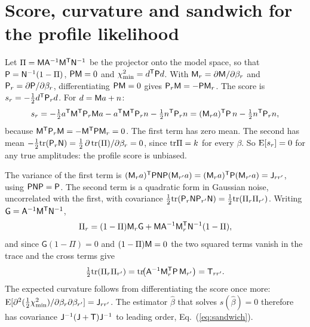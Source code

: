 \section{Score, curvature and sandwich for the profile likelihood}
\label{app:sandwich}

Let $\Pi = \mathsf{M}\mathsf{A}^{-1}\mathsf{M}^{\mathsf{T}}\mathsf{N}^{-1}$ be the projector onto the model space, so that
$\mathsf{P} = \mathsf{N}^{-1}(1 - \Pi)$, $\mathsf{P}\mathsf{M} = 0$ and $\chi^2_{\min} = d^{\mathsf{T}}\mathsf{P} d$. With $\mathsf{M}_r = \partial\mathsf{M}/\partial\beta_r$
and $\mathsf{P}_r = \partial\mathsf{P}/\partial\beta_r$, differentiating $\mathsf{P}\mathsf{M} = 0$ gives $\mathsf{P}_r\mathsf{M} = -\mathsf{P}\mathsf{M}_r$. The
score is $s_r = -\tfrac12 d^{\mathsf{T}}\mathsf{P}_r d$. For $d = \mathsf{M} a + n$:
\begin{equation}
  s_r = -\tfrac12 a^{\mathsf{T}}\mathsf{M}^{\mathsf{T}}\mathsf{P}_r\mathsf{M} a - a^{\mathsf{T}}\mathsf{M}^{\mathsf{T}}\mathsf{P}_r n - \tfrac12 n^{\mathsf{T}}\mathsf{P}_r n
      = (\mathsf{M}_r a)^{\mathsf{T}}\mathsf{P}\, n - \tfrac12 n^{\mathsf{T}}\mathsf{P}_r n ,
\end{equation}
because $\mathsf{M}^{\mathsf{T}}\mathsf{P}_r\mathsf{M} = -\mathsf{M}^{\mathsf{T}}\mathsf{P}\mathsf{M}_r = 0$. The first term has zero mean. The second has mean
$-\tfrac12\mathrm{tr}(\mathsf{P}_r\mathsf{N}) = \tfrac12\,\partial\,\mathrm{tr}(\Pi)/\partial\beta_r = 0$, since
$\mathrm{tr}\Pi = k$ for every $\beta$. So $\mathrm{E}[s_r] = 0$ for any true amplitudes: the profile score is
unbiased.

The variance of the first term is $(\mathsf{M}_r a)^{\mathsf{T}}\mathsf{P}\mathsf{N}\mathsf{P}(\mathsf{M}_{r'}a) = (\mathsf{M}_r a)^{\mathsf{T}}\mathsf{P}(\mathsf{M}_{r'}a) =
\mathsf{J}_{rr'}$, using $\mathsf{P}\mathsf{N}\mathsf{P} = \mathsf{P}$. The second term is a quadratic form in Gaussian noise,
uncorrelated with the first, with covariance $\tfrac12\mathrm{tr}(\mathsf{P}_r\mathsf{N}\mathsf{P}_{r'}\mathsf{N}) =
\tfrac12\mathrm{tr}(\Pi_r\Pi_{r'})$. Writing $\mathsf{G} = \mathsf{A}^{-1}\mathsf{M}^{\mathsf{T}}\mathsf{N}^{-1}$,
\begin{equation}
  \Pi_r = (1 - \Pi)\mathsf{M}_r\mathsf{G} + \mathsf{M}\mathsf{A}^{-1}\mathsf{M}_r^{\mathsf{T}}\mathsf{N}^{-1}(1 - \Pi) ,
\end{equation}
and since $\mathsf{G}(1-\Pi) = 0$ and $(1-\Pi)\mathsf{M} = 0$ the two squared terms vanish in the
trace and the cross terms give
\begin{equation}
  \tfrac12\mathrm{tr}(\Pi_r\Pi_{r'}) = \mathrm{tr}\!\big(\mathsf{A}^{-1}\mathsf{M}_r^{\mathsf{T}}\mathsf{P}\,\mathsf{M}_{r'}\big) = \mathsf{T}_{rr'} .
\end{equation}
The expected curvature follows from differentiating the score once more:
$\mathrm{E}[\partial^2(\tfrac12\chi^2_{\min})/\partial\beta_r\partial\beta_{r'}] = \mathsf{J}_{rr'}$. The estimator
$\hat\beta$ that solves $s(\hat\beta) = 0$ therefore has covariance $\mathsf{J}^{-1}(\mathsf{J}+\mathsf{T})\mathsf{J}^{-1}$ to
leading order, Eq.~(\ref{eq:sandwich}).

